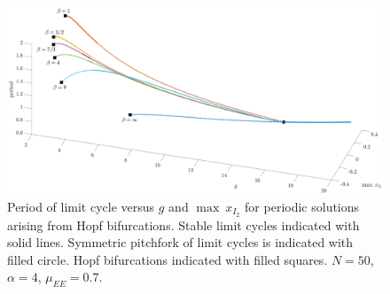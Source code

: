 \documentclass[reqno]{siamonline190516}
\newcommand{\xvec}{\mathbf{x}}
\begin{document}
\begin{figure}
    \centering
    \includegraphics[width=16cm]{images/periodvsgN50.eps}
    \caption{Period of limit cycle versus $g$ and $\max \: x_{I_2}$ for periodic solutions arising from Hopf bifurcations. Stable limit cycles indicated with solid lines. Symmetric pitchfork of limit cycles is indicated with filled circle. Hopf bifurcations indicated with filled squares. $N = 50$,  $\alpha = 4$, $\mu_{EE} = 0.7$.}
    \label{fig:periodvsg50}
\end{figure}


\end{document}
